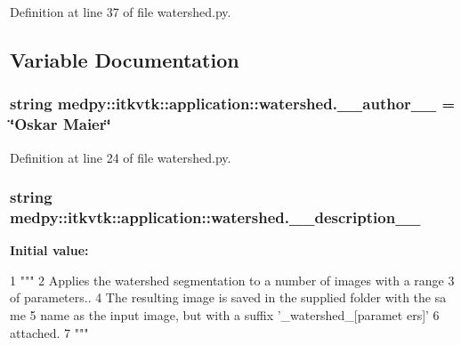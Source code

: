 Definition at line 37 of file watershed.py.



\subsection{Variable Documentation}
\hypertarget{namespacemedpy_1_1itkvtk_1_1application_1_1watershed_a4c672a0843a1def3401038ef02138369}{
\subsubsection[{\_\-\_\-author\_\-\_\-}]{\setlength{\rightskip}{0pt plus 5cm}string {\bf medpy::itkvtk::application::watershed.\_\-\_\-author\_\-\_\-} = \char`\"{}Oskar Maier\char`\"{}}}
\label{namespacemedpy_1_1itkvtk_1_1application_1_1watershed_a4c672a0843a1def3401038ef02138369}


Definition at line 24 of file watershed.py.

\hypertarget{namespacemedpy_1_1itkvtk_1_1application_1_1watershed_a500aba0bc2b21d8d3c1bf4dcd2573254}{
\subsubsection[{\_\-\_\-description\_\-\_\-}]{\setlength{\rightskip}{0pt plus 5cm}string {\bf medpy::itkvtk::application::watershed.\_\-\_\-description\_\-\_\-}}}
\label{namespacemedpy_1_1itkvtk_1_1application_1_1watershed_a500aba0bc2b21d8d3c1bf4dcd2573254}
{\bfseries Initial value:}
\begin{DoxyCode}
1 """
2                   Applies the watershed segmentation to a number of images with a
       range
3                   of parameters..
4                   The resulting image is saved in the supplied folder with the sa
      me
5                   name as the input image, but with a suffix '_watershed_[paramet
      ers]'
6                   attached.
7                   """
\end{DoxyCode}


